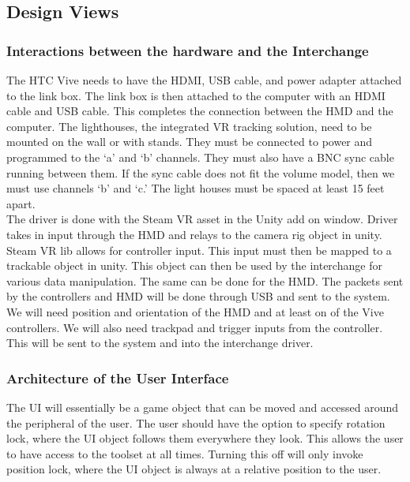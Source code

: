 \documentclass[onecolumn, draftclsnofoot,10pt, compsoc]{IEEEtran}
\begin{document}
\subsection{Design Views}

\subsubsection{Interactions between the hardware and the Interchange}
The HTC Vive needs to have the HDMI, USB cable, and power adapter attached to the link box. The link box is then attached to the computer with an HDMI cable and USB cable. This completes the connection between the HMD and the computer.
The lighthouses, the integrated VR tracking solution, need to be mounted on the wall or with stands. They must be connected to power and programmed to the ‘a’ and ‘b’ channels. They must also have a BNC sync cable running between them. If the sync cable does not fit the volume model, then we must use channels ‘b’ and ‘c.’ The light houses must be spaced at least 15 feet apart. \\

The driver is done with the Steam VR asset in the Unity add on window. Driver takes in input through the HMD and relays to the camera rig object in unity. Steam VR lib allows for controller input. This input must then be mapped to a trackable object in unity. This object can then be used by the interchange for various data manipulation. The same can be done for the HMD. 
The packets sent by the controllers and HMD will be done through USB and sent to the system. We will need position and orientation of the HMD and at least on of the Vive controllers. We will also need trackpad and trigger inputs from the controller. This will be sent to the system and into the interchange driver.\\


\subsubsection{Architecture of the User Interface}
The UI will essentially be a game object that can be moved and accessed around the peripheral of the user. The user should have the option to specify rotation lock, where the UI object follows them everywhere they look. This allows the user to have access to the toolset at all times. Turning this off will only invoke position lock, where the UI object is always at a relative position to the user. \\
\end{document}
